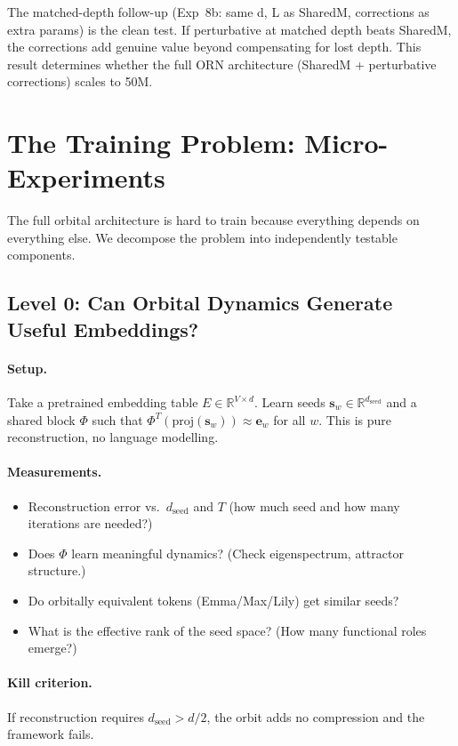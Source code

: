 \documentclass[11pt, a4paper]{article}
\newcommand{\s}{\mathbf{s}}
\newcommand{\R}{\mathbb{R}}
\theoremstyle{remark}
\begin{document}
The matched-depth follow-up (Exp~8b: same d, L as SharedM, corrections as extra params) is the clean test.
If perturbative at matched depth beats SharedM, the corrections add genuine value beyond compensating for lost depth.
This result determines whether the full ORN architecture (SharedM + perturbative corrections) scales to 50M.


\section{The Training Problem: Micro-Experiments}

The full orbital architecture is hard to train because everything depends on everything else.
We decompose the problem into independently testable components.

\subsection{Level 0: Can Orbital Dynamics Generate Useful Embeddings?}

\paragraph{Setup.}
Take a pretrained embedding table $E \in \R^{V \times d}$.
Learn seeds $\s_w \in \R^{d_{\text{seed}}}$ and a shared block $\Phi$ such that $\Phi^T(\text{proj}(\s_w)) \approx \mathbf{e}_w$ for all $w$.
This is pure reconstruction, no language modelling.

\paragraph{Measurements.}
\begin{itemize}[nosep]
    \item Reconstruction error vs.\ $d_{\text{seed}}$ and $T$ (how much seed and how many iterations are needed?)
    \item Does $\Phi$ learn meaningful dynamics? (Check eigenspectrum, attractor structure.)
    \item Do orbitally equivalent tokens (Emma/Max/Lily) get similar seeds?
    \item What is the effective rank of the seed space? (How many functional roles emerge?)
\end{itemize}

\paragraph{Kill criterion.}
If reconstruction requires $d_{\text{seed}} > d/2$, the orbit adds no compression and the framework fails.
\end{document}
